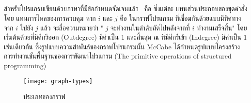 \subsection{\FirstTimeDefine{\ProgramGraph}{\ProgramGraphEN}} 

สำหรับโปรแกรมเขียนด้วยภาษาที่มีข้อกำหนดจัดเจนแล้ว {\ProgramGraph}\ คือ \FirstTimeDefine{\DirectedGraph}{\DirectedGraphEN} 
ซึ่งแต่ละ {\FirstTimeDefine{\Node}{\NodeEN}} แทนส่วนประกอบของชุดคำสั่ง โดย{\FirstTimeDefine{\Edge}{\EdgeEN}} แทนการไหลของการควบคุม 
หาก $i$ และ $j$ คือ {\Node}ในกราฟโปรแกรม ที่เชื่อมกันด้วย{\Edge}แบบมีทิศทางจาก $i$ ไปยัง $j$ แล้ว จะสื่อความหมายว่า 
"{\Node} $j$ จะทำงานในลำดับถัดไปหลังจากที่ $i$ ทำงานเสร็จสิ้น" \cite{Jorgensen2013} โดยเริ่มต้นด้วย{\Node}ที่มีดีกรีออก 
(Outdegree) มีค่าเป็น 1 และสิ้นสุด ณ \Node ที่มีดีกรีเข้า (Indegree) มีค่าเป็น 1 เช่นเดียวกัน ซึ่งรูปแบบความสำพันธ์ของกราฟโปรแกรมนั้น 
McCabe \cite{Watson1996} ได้กำหนดรูปแบบโครงสร้างการทำงานขั้นพื้นฐานของการพัฒนาโปรแกรม 
(The primitive operations of structured programming) 

\begin{figure}[ht!]
    \centering
    \texttt{[image: graph-types]}
    \caption{ประเภทของกราฟ}
    \label{fig:graphtype}
\end{figure}

